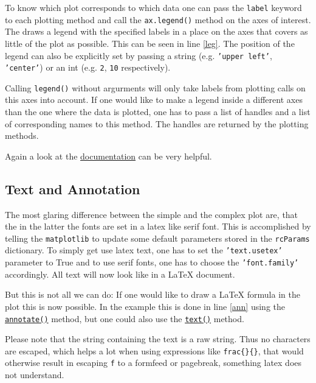 \documentclass[a4paper, 11pt, twocolumn]{article}
\newcommand{\mpl}{\texttt{matplotlib}\xspace}
\newcommand{\pl}[1]{\mbox{\texttt{#1}\xspace}}
\newcommand{\latex}{\LaTeX\xspace}
\begin{document}
To know which plot corresponds to which data one can pass the \pl{label} 
keyword to each plotting method and call the \pl{ax.legend()} method on the
axes of interest. The draws a legend with the specified labels in a place on
the axes that covers as little of the plot as possible. This can be seen in
line \ref{leg}. The position of the legend can also be explicitly set by 
passing a string (e.g. \pl{'upper left'}, \pl{'center'}) or an int (e.g.
\pl{2}, \pl{10} respectively).

Calling \pl{legend()} without argurments will only take labels from plotting
calls on this axes into account. If one would like to make a legend inside a
different axes than the one where the data is plotted, one has to pass a list
of handles and a list of corresponding names to this method. The handles are
returned by the plotting methods.

Again a look at the \href{https://matplotlib.org/api/_as_gen/matplotlib.axes.Axes.legend.html#matplotlib.axes.Axes.legend}{documentation}
can be very helpful.


\subsection{Text and Annotation}

The most glaring difference between the simple and the complex plot are, that 
the in the latter the fonts are set in a latex like serif font. This is
accomplished by telling the \mpl to update some default parameters stored
in the \pl{rcParams} dictionary. To simply get use latex text, one has to set
the \pl{'text.usetex'} parameter to True and to use serif fonts, one has to
choose the \pl{'font.family'} accordingly. All text will now look like in a
\latex document.

But this is not all we can do: If one would like to draw a \latex formula in
the plot this is now possible. In the example this is done in line \ref{ann}
using the \href{https://matplotlib.org/users/annotations.html}{\pl{annotate()}}
method, but one could also use the
\href{https://matplotlib.org/api/pyplot_api.html#matplotlib.pyplot.text}
{\pl{text()}} method.

Please note that the string containing the text is a raw string. Thus no 
characters are escaped, which helps a lot when using expressions like
\pl{\\frac\{\}\{\}}, that would otherwise result in escaping \pl{\\f} to a
formfeed or pagebreak, something latex does not understand.
\end{document}
